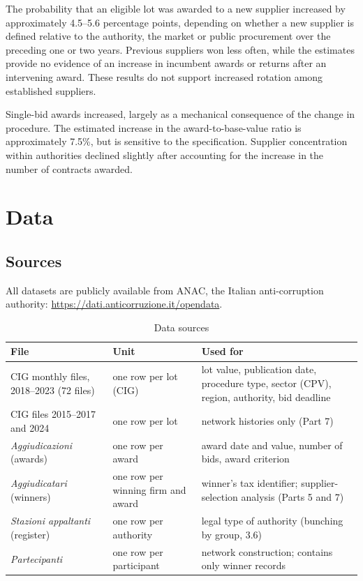 \documentclass[11pt,a4paper]{article}
\begin{document}
The probability that an eligible lot was awarded to a new supplier increased by approximately 4.5--5.6 percentage points, depending on whether a new supplier is defined relative to the authority, the market or public procurement over the preceding one or two years. Previous suppliers won less often, while the estimates provide no evidence of an increase in incumbent awards or returns after an intervening award. These results do not support increased rotation among established suppliers.

Single-bid awards increased, largely as a mechanical consequence of the change in procedure. The estimated increase in the award-to-base-value ratio is approximately 7.5\%, but is sensitive to the specification. Supplier concentration within authorities declined slightly after accounting for the increase in the number of contracts awarded.

\section{Data}

\subsection{Sources}

All datasets are publicly available from ANAC, the Italian anti-corruption authority: \url{https://dati.anticorruzione.it/opendata}.

\begin{table}[H]
\centering\small
\caption{Data sources}
\label{tab:sources}
\begin{tabularx}{\textwidth}{>{\raggedright}p{3.6cm}>{\raggedright}p{3.2cm}X}
\toprule
File & Unit & Used for \\
\midrule
CIG monthly files, 2018--2023 (72 files) & one row per lot (CIG) & lot value, publication date, procedure type, sector (CPV), region, authority, bid deadline \\
CIG files 2015--2017 and 2024 & one row per lot & network histories only (Part 7) \\
\textit{Aggiudicazioni} (awards) & one row per award & award date and value, number of bids, award criterion \\
\textit{Aggiudicatari} (winners) & one row per winning firm and award & winner's tax identifier; supplier-selection analysis (Parts 5 and 7) \\
\textit{Stazioni appaltanti} (register) & one row per authority & legal type of authority (bunching by group, 3.6) \\
\textit{Partecipanti} & one row per participant & network construction; contains only winner records \\
\bottomrule
\end{tabularx}
\end{table}
\end{document}

